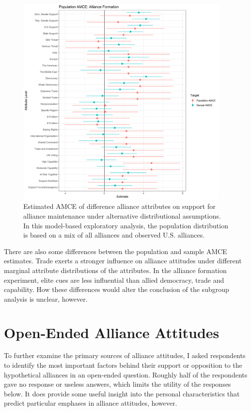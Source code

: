 \documentclass[12pt]{article}
\begin{document}
\begin{figure}
	\centering
		\includegraphics[width=0.95\textwidth]{pop-amce-form.png}
	\caption{Estimated AMCE of difference alliance attributes on support for alliance maintenance under alternative distributional assumptions. In this model-based exploratory analysis, the population distribution is based on a mix of all alliances and observed U.S. alliances.}
	\label{fig:pop-amce-form}
\end{figure}

There are also some differences between the population and sample AMCE estimates. 
Trade exerts a stronger influence on alliance attitudes under different marginal attribute distributions of the attributes. 
In the alliance formation experiment, elite cues are less influential than allied democracy, trade and capability. 
How these differences would alter the conclusion of the subgroup analysis is unclear, however. 


\newpage


\section{Open-Ended Alliance Attitudes} 


To further examine the primary sources of alliance attitudes, I asked respondents to identify the most important factors behind their support or opposition to the hypothetical alliances in an open-ended question. 
Roughly half of the respondents gave no response or useless answers, which limits the utility of the responses below. 
It does provide some useful insight into the personal characteristics that predict particular emphases in alliance attitudes, however. 
\end{document}
